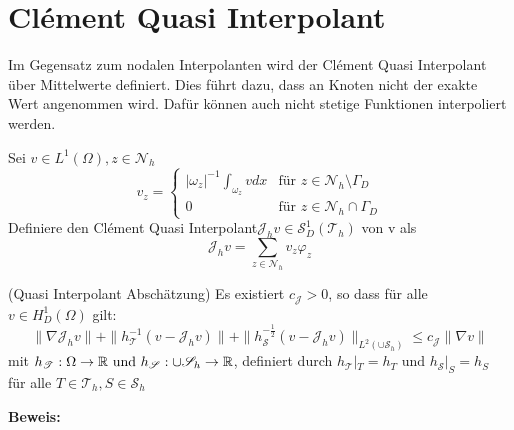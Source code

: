 \section{Clément Quasi Interpolant}
Im Gegensatz zum nodalen Interpolanten wird der Clément Quasi Interpolant über Mittelwerte definiert. Dies führt dazu, dass an Knoten nicht der exakte Wert angenommen wird. Dafür können auch nicht stetige Funktionen interpoliert werden.
\begin{definition}
    Sei $v \in L^1(\Omega) , z \in \mathscr{N}_h$
	\[
	v_z =  \left\{
	\begin{array}{ll}
		|\omega_z|^{-1} \int_{\omega_z} v dx& \text{f\"ur } z \in \mathscr{N}_h \setminus \Gamma_D\\
		0 &  \text{f\"ur } z \in \mathscr{N}_h \cap \Gamma_D
	\end{array}\right.
	\]
	Definiere den Clément Quasi Interpolant$\mathscr{J}_hv \in \mathscr{S}_D^1(\mathscr{T}_h)$ von v als
	\begin{displaymath}
		\mathscr{J}_hv = \sum_{z\in \mathscr{N}_h} v_z \varphi_z
	\end{displaymath}
\end{definition}
\begin{theorem}(Quasi Interpolant Abschätzung)
	Es existiert $c_\mathscr{J} > 0$, so dass f\"ur alle $v\in H^1_D(\Omega)$ gilt:
	\[
	\|\nabla\mathscr{J}_hv\| +\|h^{-1}_\mathscr{T}(v-\mathscr{J}_hv)\| +\|h^{-\frac{1}{2}}_\mathscr{S}(v-\mathscr{J}_hv)\|_{L^2(\cup\mathscr{S}_h)} \leq c_\mathscr{J}\|\nabla v\|
	\]
	mit $h_\mathscr{T}: \Omega \rightarrow  \mathbb{R} \text{ und } h_\mathscr{S}: \cup \mathscr{S}_h \rightarrow  \mathbb{R}$, definiert durch $h_\mathscr{T}|_T = h_T \text{ und }  h_\mathscr{S}|_S = h_S$ \\ f\"ur alle $T\in\mathscr{T}_h, S\in\mathscr{S}_h$ 
\end{theorem}
\textbf{Beweis:}
